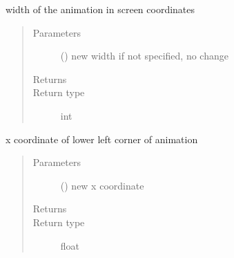 \documentclass[letterpaper,10pt,english]{sphinxmanual}
\begin{document}
\begin{fulllineitems}
\begin{fulllineitems}
\end{fulllineitems}


\begin{fulllineitems}
\label{\detokenize{Reference:salabim.Environment.width}}
width of the animation in screen coordinates
\begin{quote}\begin{description}
\item[{Parameters}] \leavevmode
{} () \textendash{} new width 
if not specified, no change

\item[{Returns}] \leavevmode
{}

\item[{Return type}] \leavevmode
int

\end{description}\end{quote}

\end{fulllineitems}


\begin{fulllineitems}
\label{\detokenize{Reference:salabim.Environment.x0}}
x coordinate of lower left corner of animation
\begin{quote}\begin{description}
\item[{Parameters}] \leavevmode
{} () \textendash{} new x coordinate

\item[{Returns}] \leavevmode
{}

\item[{Return type}] \leavevmode
float

\end{description}\end{quote}

\end{fulllineitems}



\end{fulllineitems}
\end{document}
